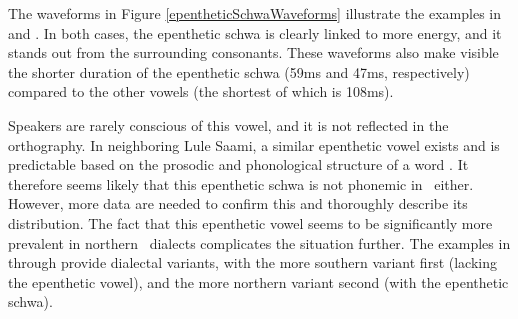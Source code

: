 The waveforms in Figure \vref{epentheticSchwaWaveforms} 
illustrate the examples in   
and . 
In both cases, the epenthetic schwa is clearly linked to more energy, and it stands out from the surrounding consonants. %
These waveforms also make visible the shorter duration of the epenthetic schwa (59ms and 47ms, respectively) compared to the other vowels (the shortest of which is 108ms).


Speakers are rarely conscious of this vowel, and it is not reflected in the orthography. In neighboring Lule Saami, a similar epenthetic vowel exists and is predictable based on the prosodic and phonological structure of a word \citep[cf.][14-15]{Spiik1989}. It therefore seems likely that this epenthetic schwa is not phonemic in \PS\ either. However, more data are needed to confirm this and thoroughly describe its distribution. The fact that this epenthetic vowel seems to be significantly more prevalent in northern \PS\ dialects complicates the situation further. The examples in  through  provide dialectal variants, with the more southern variant first (lacking the epenthetic vowel), and the more northern variant second (with the epenthetic schwa).
\ea\label{quick}
\z
\ea\label{deliciousPRED}
\z
\ea\label{whitefishNOMSG}
\z


